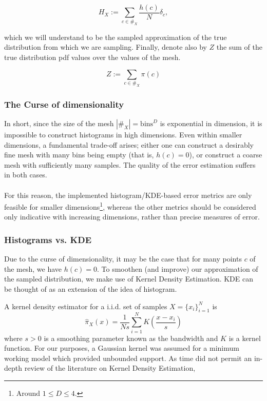 $$H_X := \sum_{c \in \#_X} \frac {h(c)} N   \delta_c,$$

which we will understand to be the sampled approximation of the true distribution from which we are sampling. Finally, denote also by $Z$ the sum of the true distribution pdf values over the values of the mesh.

\[Z := \sum_{c \in \#_X} \pi(c)\]



\subsubsection{The Curse of dimensionality}

In short, since the size of the mesh $|\#_X| = \text{bins}^D$ is exponential in dimension, it is impossible to construct histograms in high dimensions. Even within smaller dimensions, a fundamental trade-off arises; either one can construct a desirably fine mesh with many bins being empty (that is, $h(c) = 0$), or construct a coarse mesh with sufficiently many samples. The quality of the error estimation suffers in both cases. \\\\
For this reason, the implemented  histogram/KDE-based  error metrics are only feasible for smaller dimensions\footnote{Around $1 \leq D \leq 4$.}, whereas the other metrics should be considered only indicative with increasing dimensions, rather than precise measures of error.

\subsubsection{Histograms vs. KDE}
Due to the curse of dimensionality, it may be the case that for many points $c$ of the mesh, we have $h(c) = 0$. To smoothen (and improve) our approximation of the sampled distribution, we make use of Kernel Density Estimation. KDE can be thought of as an extension of the idea of histogram.

\begin{defn}[KDE]
A kernel density estimator for a i.i.d. set of samples $X = \{x_i\}_{i=1}^N$ is
\[\hat{\pi}_{X} (x) = \frac 1 {Ns} \sum_{i=1}^N K\left( \frac{x - x_i}{s} \right)\]
where $s > 0$ is a smoothing parameter known as the bandwidth and $K$ is a kernel function.  For our purposes, a Gaussian kernel was assumed for a minimum working model which provided unbounded support.  As time did not permit an in-depth review of the literature on Kernel Density Estimation, 
\end{defn}

